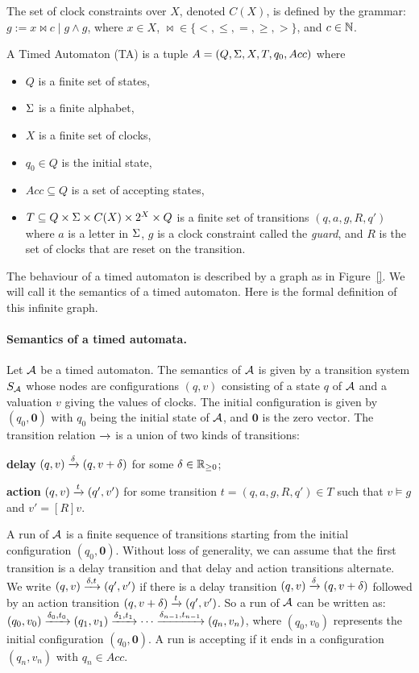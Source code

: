 The set of clock constraints over $X$, denoted $C(X)$, is defined by the grammar: $g:= x \bowtie c \mid g \wedge g$, where $x \in X$, $\bowtie \in \{<, \leq, =, \geq, >\}$, and $c \in \N$.

\begin{definition}
A \textsf{Timed Automaton (TA)} is a tuple $A = (Q, \S, X, T, q_0, Acc)$ where
\begin{itemize}
	\item $Q$ is a finite set of states,
	\item $\S$ is a finite alphabet,
	\item $X$ is a finite set of clocks,
	\item $q_0 \in Q$ is the initial state,
	\item $Acc \subseteq Q$ is a set of accepting states,
	\item $T \subseteq Q \times \S \times C(X) \times 2^X \times Q$ is a finite set of transitions $(q, a, g, R, q')$ where $a$ is a letter in $\S$, $g$ is a clock constraint called the \textit{guard}, and $R$ is the set of clocks that are reset on the transition.
\end{itemize}
\end{definition}

The behaviour of a timed automaton is described by a graph as in Figure~\ref{}. We will call it the semantics of a timed automaton. Here is the formal definition of this infinite graph.

\paragraph*{Semantics of a timed automata.} Let $\calA$ be a timed automaton. The semantics of $\calA$ is given by a transition system $S_\calA$ whose nodes are configurations $(q, v)$ consisting of a state $q$ of $\calA$ and a valuation $v$ giving the values of clocks. The initial configuration is given by $(q_0, \textbf{0})$ with $q_0$ being the initial state of $\calA$, and $\textbf{0}$ is the zero vector. The transition relation $\xra{}$ is a union of two kinds of transitions:

\textbf{delay} $(q, v) \xra{\delta} (q, v + \delta)$ for some $\delta \in \Rpos$;

\textbf{action} $(q, v) \xra{t} (q', v')$ for some transition $t = (q, a, g, R, q') \in T$ such that $v \models g$ and
$v' = [R]v$.

A \textsf{run} of $\calA$ is a finite sequence of transitions starting from the initial configuration $(q_0, \textbf{0})$. Without loss of generality, we can assume that the first transition is a delay transition and that delay and action transitions alternate. We write $(q, v) \xra{\d, t} (q', v')$ if there is a delay transition $(q, v) \xra{\d} (q, v + \d)$ followed by an action transition $(q, v + \d) \xra{t} (q', v')$. So a run of $\calA$ can be written as: $(q_0, v_0) \xra{\d_0, t_0} (q_1, v_1) \xra{\d_1, t_1} \cdots \xra{\d_{n-1}, t_{n-1}} (q_n, v_n)$, where $(q_0, v_0)$ represents the initial configuration $(q_0, \textbf{0})$. A run is accepting if it ends in a configuration $(q_n, v_n)$ with $q_n \in Acc$.

